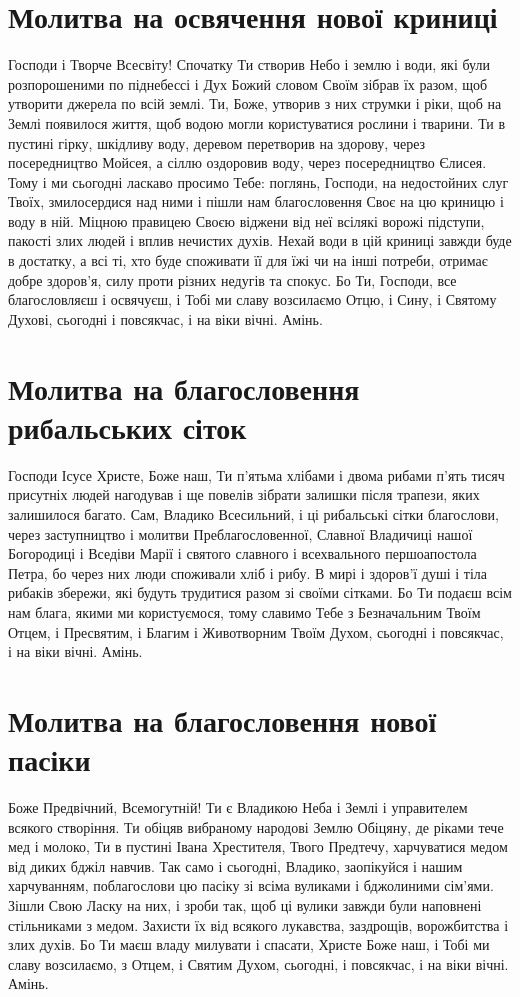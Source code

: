 \documentclass[chapters.tex]{subfiles}
\begin{document}
\section{Молитва на освячення нової криниці}
Господи і Творче Всесвіту! Спочатку Ти створив Небо і землю і води, які були розпорошеними по піднебессі і Дух Божий словом Своїм зібрав їх разом, щоб утворити джерела по всій землі. Ти, Боже, утворив з них струмки і ріки, щоб на Землі появилося життя, щоб водою могли користуватися рослини і тварини. Ти в пустині гірку, шкідливу воду, деревом перетворив на здорову, через посередництво Мойсея, а сіллю оздоровив воду, через посередництво Єлисея. Тому і ми сьогодні ласкаво просимо Тебе: поглянь, Господи, на недостойних слуг Твоїх, змилосердися над ними і пішли нам благословення Своє на цю криницю і воду в ній. Міцною правицею Своєю віджени від неї всілякі ворожі підступи, пакості злих людей і вплив нечистих духів. Нехай води в цій криниці завжди буде в достатку, а всі ті, хто буде споживати її для їжі чи на інші потреби, отримає добре здоров’я, силу проти різних недугів та спокус. Бо Ти, Господи, все благословляєш і освячуєш, і Тобі ми славу возсилаємо Отцю, і Сину, і Святому Духові, сьогодні і повсякчас, і на віки вічні. Амінь.

\section{Молитва на благословення рибальських сіток}
Господи Ісусе Христе, Боже наш, Ти п’ятьма хлібами і двома рибами п’ять тисяч присутніх людей нагодував і ще повелів зібрати залишки після трапези, яких залишилося багато. Сам, Владико Всесильний, і ці рибальські сітки благослови, через заступництво і молитви Преблагословенної, Славної Владичиці нашої Богородиці і Вседіви Марії і святого славного і всехвального першоапостола Петра, бо через них люди споживали хліб і рибу. В мирі і здоров’ї душі і тіла рибаків збережи, які будуть трудитися разом зі своїми сітками. Бо Ти подаєш всім нам блага, якими ми користуємося, тому славимо Тебе з Безначальним Твоїм Отцем, і Пресвятим, і Благим і Животворним Твоїм Духом, сьогодні і повсякчас, і на віки вічні. Амінь.

\section{Молитва на благословення нової пасіки}
Боже Предвічний, Всемогутній! Ти є Владикою Неба і Землі і управителем всякого створіння. Ти обіцяв вибраному народові Землю Обіцяну, де ріками тече мед і молоко, Ти в пустині Івана Хрестителя, Твого Предтечу, харчуватися медом від диких бджіл навчив. Так само і сьогодні, Владико, заопікуйся і нашим харчуванням, поблагослови цю пасіку зі всіма вуликами і бджолиними сім’ями. Зішли Свою Ласку на них, і зроби так, щоб ці вулики завжди були наповнені стільниками з медом. Захисти їх від всякого лукавства, заздрощів, ворожбитства і злих духів. Бо Ти маєш владу милувати і спасати, Христе Боже наш, і Тобі ми славу возсилаємо, з Отцем, і Святим Духом, сьогодні, і повсякчас, і на віки вічні. Амінь.
\end{document}
